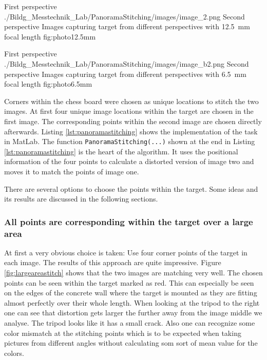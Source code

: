\documentclass[
a4paper,     %
12pt         %
]{scrartcl}  %
\begin{document}
{First perspective}
{./Bildg_Messtechnik_Lab/PanoramaStitching/images/image_2.png}
{Second perspective}
{Images capturing target from different perspectives with \SI{12.5}{mm} focal length}
{fig:photo12.5mm}

{First perspective}
{./Bildg_Messtechnik_Lab/PanoramaStitching/images/image_b2.png}
{Second perspective}
{Images capturing target from different perspectives with \SI{6.5}{mm} focal length}
{fig:photo6.5mm}

Corners within the chess board were chosen as unique locations to stitch the two images.
At first four unique image locations within the target are chosen in the first image.
The corresponding points within the second image are chosen directly afterwards.
Listing \ref{lst:panoramastitching} shows the implementation of the task in MatLab.
The function \lstinline{PanoramaStitching(...)} shown at the end in Listing \ref{lst:panoramastitching} is the heart of the algorithm.
It uses the positional information of the four points to calculate a distorted version of image two and moves it to match the points of image one.



There are several options to choose the points within the target.
Some ideas and its results are discussed in the following sections.

\subsubsection{All points are corresponding within the target over a large area}

At first a very obvious choice is taken: Use four corner points of the target in each image.
The results of this approach are quite impressive.
Figure \ref{fig:largeareastitch} shows that the two images are matching very well.
The chosen points can be seen within the target marked as red.
This can especially be seen on the edges of the concrete wall where the target is mounted as they are fitting almost perfectly over their whole length.
When looking at the tripod to the right one can see that distortion gets larger the further away from the image middle we analyse.
The tripod looks like it has a small crack.
Also one can recognize some color mismatch at the stitching points which is to be expected when taking pictures from different angles without calculating som sort of mean value for the colors.
\end{document}
